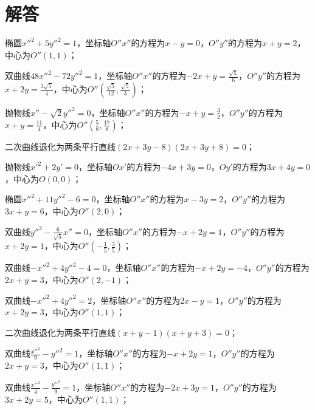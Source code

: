 \section{解答}
\begin{solution}
  \begin{inparaenum}[(1)]
    \item 椭圆$x''^2+5y''^2=1$，坐标轴$O''x''$的方程为$x-y=0$，$O''y''$的方程为$x+y=2$，中心为$O''(1,1)$；

    \item 双曲线$48x''^2-72y''^2=1$，坐标轴$O''x''$的方程为$-2x+y=\frac{\sqrt5}6$，$O''y''$的方程为$x+2y=\frac{3\sqrt5}4$，中心为$O''\left(\frac{\sqrt5}{12},
        \frac{\sqrt5}3\right)$；

    \item 抛物线$x''-\sqrt2y''^2=0$，坐标轴$O''x''$的方程为$-x+y=\frac32$，$O''y''$的方程为$x+y=\frac{11}4$，中心为$O''\left(\frac58,\frac{17}8\right)$；

    \item 二次曲线退化为两条平行直线$(2x+3y-8)(2x+3y+8)=0$；

    \item 抛物线$x'^2+2y'=0$，坐标轴$Ox'$的方程为$-4x+3y=0$，$Oy'$的方程为$3x+4y=0$，中心为$O(0,0)$；

    \item 椭圆$x''^2+11y''^2-6=0$，坐标轴$O''x''$的方程为$x-3y=2$，$O''y''$的方程为$3x+y=6$，中心为$O''(2,0)$；

    \item 双曲线$y''^2-\frac6{\sqrt5}x''=0$，坐标轴$O''x''$的方程为$-x+2y=1$，$O''y''$的方程为$x+2y=1$，中心为$O''\left(-\frac15,\frac35\right)$；

    \item 双曲线$-x''^2+4y''^2-4=0$，坐标轴$O''x''$的方程为$-x+2y=-4$，$O''y''$的方程为$2x+y=3$，中心为$O''(2,-1)$；

    \item 双曲线$-x''^2+4y''^2=2$，坐标轴$O''x''$的方程为$2x-y=1$，$O''y''$的方程为$x+2y=3$，中心为$O''(1,1)$；

    \item 二次曲线退化为两条平行直线$(x+y-1)(x+y+3)=0$；

    \item 双曲线$\frac{x''^2}9-y''^2=1$，坐标轴$O''x''$的方程为$-x+2y=1$，$O''y''$的方程为$2x+y=3$，中心为$O''(1,1)$；

    \item 双曲线$\frac{x''^2}4-\frac{y''^2}9=1$，坐标轴$O''x''$的方程为$-2x+3y=1$，$O''y''$的方程为$3x+2y=5$，中心为$O''(1,1)$；


\end{inparaenum}
\end{solution}
